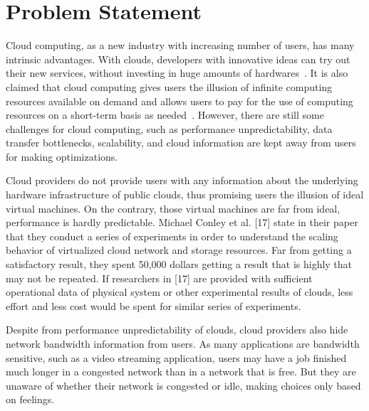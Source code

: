 \section{Problem Statement}
\label{sec:ProblemStatement}

Cloud computing, as a new industry with increasing number of users, has many intrinsic advantages. With clouds, developers with innovative ideas can try out their new services, without investing in huge amounts of hardwares~\cite{Armbrust2009}. It is also claimed that cloud computing gives users the illusion of infinite computing resources available on demand and allows users to pay for the use of computing resources on a short-term basis as needed~\cite{Armbrust2009}. However, there are still some challenges for cloud computing, such as performance unpredictability, data transfer bottlenecks, scalability, and cloud information are kept away from users for making optimizations.

Cloud providers do not provide users with any information about the underlying hardware infrastructure of public clouds, thus promising users the illusion of ideal virtual machines. On the contrary, those virtual machines are far from ideal, performance is hardly predictable. Michael Conley et al. [17] state in their paper that they conduct a series of experiments in order to understand the scaling behavior of virtualized cloud network and storage resources. Far from getting a satisfactory result, they spent 50,000 dollars getting a result that is highly that may not be repeated. If researchers in [17] are provided with sufficient operational data of physical system  or other experimental results of clouds, less effort and less cost would be spent for similar series of experiments.

Despite from performance unpredictability of clouds, cloud providers also hide network bandwidth information from users. As many applications are bandwidth sensitive, such as a video streaming application, users may have a job finished much longer in a congested network than in a network that is free. But they are unaware of whether their network is congested or idle, making choices only based on feelings. 


